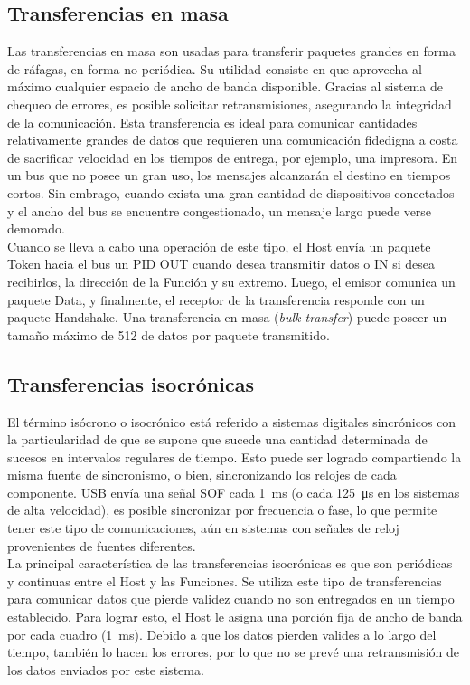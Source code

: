 \subsection{Transferencias en masa}
	Las transferencias en masa son usadas para transferir paquetes grandes en forma de ráfagas, en forma no periódica. Su utilidad consiste en que aprovecha al máximo cualquier espacio de ancho de banda disponible. Gracias al sistema de chequeo de errores, es posible solicitar retransmisiones, asegurando la integridad de la comunicación. Esta transferencia es ideal para comunicar cantidades relativamente grandes de datos que requieren una comunicación fidedigna a costa de sacrificar velocidad en los tiempos de entrega, por ejemplo, una impresora. En un bus que no posee un gran uso, los mensajes alcanzarán el destino en tiempos cortos. Sin embrago, cuando exista una gran cantidad de dispositivos conectados y el ancho del bus se encuentre congestionado, un mensaje largo puede verse demorado.\\

	Cuando se lleva a cabo una operación de este tipo, el Host envía un paquete Token hacia el bus un PID OUT cuando desea transmitir datos o IN si desea recibirlos, la dirección de la Función y su extremo. Luego, el emisor comunica un paquete Data, y finalmente, el receptor de la transferencia responde con un paquete Handshake. Una transferencia en masa ({\it bulk transfer}) puede poseer un tamaño máximo de \SI{512}{\byte} de datos por paquete transmitido.
	
\subsection{Transferencias isocrónicas}
	El término isócrono o isocrónico está referido a sistemas digitales sincrónicos con la particularidad de que se supone que sucede una cantidad determinada de sucesos en intervalos regulares de tiempo. Esto puede ser logrado compartiendo la misma fuente de sincronismo, o bien, sincronizando los relojes de cada componente. USB envía una señal SOF cada \SI{1}{\milli\second} (o cada \SI{125}{\micro\second} en los sistemas de alta velocidad), es posible sincronizar por frecuencia o fase, lo que permite tener este tipo de comunicaciones, aún en sistemas con señales de reloj provenientes de fuentes diferentes.\\
	
	La principal característica de las transferencias isocrónicas es que son periódicas y continuas entre el Host y las Funciones. Se utiliza este tipo de transferencias para comunicar datos que pierde validez cuando no son entregados en un tiempo establecido. Para lograr esto, el Host le asigna una porción fija de ancho de banda por cada cuadro (\SI{1}{\milli\second}). Debido a que los datos pierden valides a lo largo del tiempo, también lo hacen los errores, por lo que no se prevé una retransmisión de los datos enviados por este sistema.\\
	

